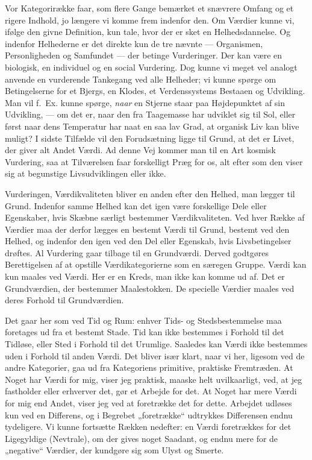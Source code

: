\documentclass[12pt,a4paper]{book}
\newcommand{\apage}[1]{\marginnote{\footnotesize\textit{[#1]}}}
\begin{document}
Vor Kategorirække faar, som flere Gange bemærket et snævrere Omfang og et rigere
Indhold, jo længere vi komme frem indenfor den. Om Værdier kunne vi, ifølge den
givne Definition, kun tale, hvor der er sket en Helhedsdannelse. Og indenfor
Helhederne er det direkte kun de tre nævnte --- Organismen, Personligheden og
Samfundet --- der betinge Vurderinger. Der kan være en biologisk, en individuel og
en social Vurdering. Dog kunne vi meget vel analogt anvende en vurderende
Tankegang ved alle Helheder; vi kunne spørge om Betingelserne for et Bjergs, en
Klodes, et Verdenssystems Bestaaen og Udvikling. Man vil f.\ Ex. kunne spørge, \emph{naar} en Stjerne staar paa Højdepunktet af sin Udvikling, --- om det er, naar den
fra Taagemasse har udviklet sig til Sol, eller først naar dens Temperatur har naat
en saa lav Grad, at organisk Liv kan blive muligt? I sidste Tilfælde vil den
Forudsætning ligge til Grund, at det er Livet, der giver alt Andet Værdi. Ad denne \apage{240}
Vej kommer man til en Art kosmisk Vurdering, saa at Tilværelsen faar forskelligt
Præg for os, alt efter som den viser sig at begunstige Livsudviklingen eller ikke.

Vurderingen, Værdikvaliteten bliver en anden efter den Helhed, man lægger til
Grund. Indenfor samme Helhed kan det igen være forskellige Dele eller Egenskaber,
hvis Skæbne særligt bestemmer Værdikvaliteten. Ved hver Række af Værdier maa der
derfor lægges en bestemt Værdi til Grund, bestemt ved den Helhed, og indenfor den
igen ved den Del eller Egenskab, hvis Livsbetingelser drøftes. Al Vurdering gaar
tilbage til en Grundværdi. Derved godtgøres Berettigelsen af at opstille
Værdikategorierne som en særegen Gruppe. Værdi kan kun maales ved Værdi. Her er en
Kreds, man ikke kan komme ud af. Det er Grundværdien, der bestemmer Maalestokken.
De specielle Værdier maales ved deres Forhold til Grundværdien.

Det gaar her som ved Tid og Rum: enhver Tids- og Stedsbestemmelse maa foretages ud
fra et bestemt Stade. Tid kan ikke bestemmes i Forhold til det Tidløse, eller Sted
i Forhold til det Urumlige. Saaledes kan Værdi ikke bestemmes uden i Forhold til
anden Værdi. Det bliver især klart, naar vi her, ligesom ved de andre Kategorier,
gaa ud fra Kategoriens primitive, praktiske Fremtræden. At Noget har Værdi for
mig, viser jeg praktisk, maaske helt uvilkaarligt, ved, at jeg fastholder eller
erhverver det, gør et Arbejde for det. At Noget har mere Værdi for mig end Andet,
viser jeg ved at foretrække det for dette. Arbejdet udløses kun ved en Differens,
og i Begrebet „foretrække“ udtrykkes Differensen endnu tydeligere. Vi kunne
fortsætte Rækken nedefter: en Værdi foretrækkes for det Ligegyldige (Nevtrale), om
der gives noget Saadant, og endnu mere for de „negative“ Værdier, der kundgøre sig
som Ulyst og Smerte.
\end{document}
